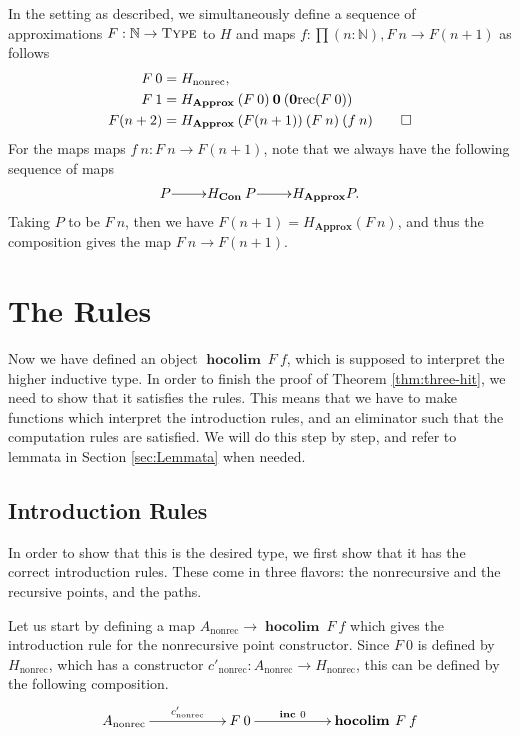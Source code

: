 \documentclass[a4paper,UKenglish]{lipics-v2016}
\newcommand{\zero}[0]{\textbf{0}}
\newcommand{\frec}[0]{\!\operatorname{rec}}
\newcommand{\nonrec}[0]{\operatorname{nonrec}}
\newcommand{\Con}[0]{\textbf{Con}}
\newcommand{\Approx}[0]{\textbf{Approx}}
\newcommand{\hocolim}[0]{\operatorname{\textbf{hocolim}}}
\newcommand{\inc}[0]{\operatorname{\textbf{inc}}}
\newcommand{\Type}[0]{\operatorname{\textsc{Type}}}
\begin{document}
\begin{definition}
In the setting as described, we simultaneously define a sequence of approximations $F : \mathbb{N} \rightarrow \Type$ to $H$ and maps $f : \prod(n : \mathbb{N}), F \> n \rightarrow F(n+1)$ as follows
\begin{align*}
F \> 0 &= H_{\nonrec},\\
F \> 1 &= H_{\Approx} \> (F \> 0) \> \zero \> (\zero\frec (F \> 0))\\
F(n+2) &= H_{\Approx} \> (F(n+1)) \> (F \> n) \> (f \> n) \qedhere
\end{align*}
For the maps maps $f \> n : F \> n \rightarrow F(n + 1)$, note that we always have the following sequence of maps
\[
\xymatrix@1
{
	P \ar[r] & H_{\Con} \> P \ar[r] & H_{\Approx} P.
}
\]
Taking $P$ to be $F \> n$, then we have $F (n+1) = H_{\Approx} (F \> n)$, and thus the composition gives the map $F \> n \rightarrow F(n + 1)$.
\end{definition}

\section{The Rules}
\label{sec:rules}
Now we have defined an object $\hocolim \> F \> f$, which is supposed to interpret the higher inductive type.
In order to finish the proof of Theorem \ref{thm:three-hit}, we need to show that it satisfies the rules.
This means that we have to make functions which interpret the introduction rules, and an eliminator such that the computation rules are satisfied.
We will do this step by step, and refer to lemmata in Section \ref{sec:Lemmata} when needed.

\subsection{Introduction Rules}
In order to show that this is the desired type, we first show that it has the correct introduction rules.
These come in three flavors: the nonrecursive and the recursive points, and the paths.

Let us start by defining a map $A_{\nonrec} \rightarrow \hocolim \> F \> f$ which gives the introduction rule for the nonrecursive point constructor.
Since $F \> 0$ is defined by $H_{\nonrec}$, which has a constructor $c'_{\nonrec} : A_{\nonrec} \rightarrow H_{\nonrec}$, this can be defined by the following composition.
\[
\xymatrix
{
	A_{\nonrec} \ar[rr]^-{c'_{\nonrec}}
		& & F \> 0 \ar[rr]^-{\inc \> 0}
		& & \hocolim \> F \> f
}
\]
\end{document}
